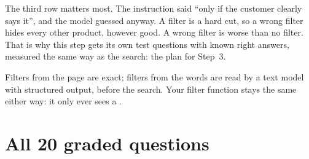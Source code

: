 \documentclass[11pt]{article}
\begin{document}
The third row matters most. The instruction said ``only if the
customer clearly says it'', and the model guessed anyway. A filter is a
hard cut, so a wrong filter hides every other product, however good.
A wrong filter is worse than no filter. That is why this step gets its
own test questions with known right answers, measured the same way as
the search: the plan for Step~3.

\begin{keypoint}
Filters from the page are exact; filters from the words are read by a
text model with structured output, before the search. Your filter
function stays the same either way: it only ever sees a
.
\end{keypoint}

\clearpage
\appendix
\section{All 20 graded questions}
\label{app:all}
\end{document}
